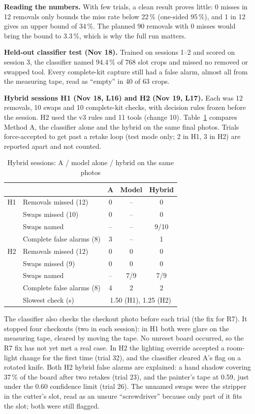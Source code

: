 \textbf{Reading the numbers.} With few trials, a clean result proves little:
0 misses in 12 removals only bounds the miss rate below 22\,\% (one-sided
95\,\%), and 1 in 12 gives an upper bound of 34\,\%. The planned 90 removals
with 0 misses would bring the bound to 3.3\,\%, which is why the full run
matters.

\textbf{Held-out classifier test (Nov 18).} Trained on sessions 1--2 and
scored on session 3, the classifier named 94.4\,\% of 768 slot crops and
missed no removed or swapped tool. Every complete-kit capture still had a
false alarm, almost all from the measuring tape, read as ``empty'' in 40 of
63 crops.

\textbf{Hybrid sessions H1 (Nov 18, L16) and H2 (Nov 19, L17).} Each was
12 removals, 10 swaps and 10 complete-kit checks, with decision rules frozen
before the session. H2 used the v3 rules and 11 tools (change 10).
Table~\ref{tab:hybrid} compares Method A, the classifier alone and the
hybrid on the same final photos. Trials force-accepted to get past a
retake loop (test mode only; 2 in H1, 3 in H2) are reported apart and not
counted.

\begin{table}[!htb]
\centering
\footnotesize
\caption{Hybrid sessions: A / model alone / hybrid on the same photos}
\label{tab:hybrid}
\begin{tabular}{@{}llccc@{}}
\toprule
 & & A & Model & Hybrid \\
\midrule
H1 & Removals missed (12)       & 0 & -- & 0 \\
   & Swaps missed (10)          & 0 & -- & 0 \\
   & Swaps named                & -- & -- & 9/10 \\
   & Complete false alarms (8)  & 3 & -- & 1 \\
\midrule
H2 & Removals missed (12)       & 0 & 0 & 0 \\
   & Swaps missed (9)           & 0 & 0 & 0 \\
   & Swaps named                & -- & 7/9 & 7/9 \\
   & Complete false alarms (8)  & 4 & 2 & 2 \\
\midrule
   & Slowest check (s)          & \multicolumn{3}{c}{1.50 (H1), 1.25 (H2)} \\
\bottomrule
\end{tabular}
\end{table}

The classifier also checks the checkout photo before each trial (the fix
for R7). It stopped four checkouts (two in each session): in H1 both were
glare on the measuring tape, cleared by moving the tape. No unreset board
occurred, so the R7 fix has not yet met a real case.
In H2 the lighting override accepted a room-light change for the first time
(trial 32), and the classifier cleared A's flag on a rotated knife. Both H2
hybrid false alarms are explained: a hand shadow covering 37\,\% of the
board after two retakes (trial 23), and the painter's tape at 0.59, just
under the 0.60 confidence limit (trial 26). The unnamed swaps were the
stripper in the cutter's slot, read as an unsure ``screwdriver'' because
only part of it fits the slot; both were still flagged.

